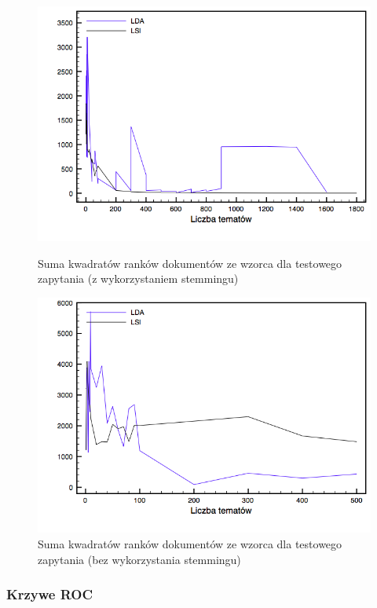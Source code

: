 \documentclass[11pt,a4paper]{article}
\begin{document}
\begin{figure}[h]
\includegraphics[width=\linewidth]{gfx/ranks_stemming.png}
\caption{Suma kwadratów ranków dokumentów ze wzorca dla testowego zapytania (z wykorzystaniem stemmingu)}
\label{ranks_stemming_comparison}

\includegraphics[width=\linewidth]{gfx/ranks_no_stemming.png}
\caption{Suma kwadratów ranków dokumentów ze wzorca dla testowego zapytania (bez wykorzystania stemmingu)}
\label{ranks_no_stemming_comparison}
\end{figure}

\FloatBarrier

\subsubsection{Krzywe ROC}
\end{document}
